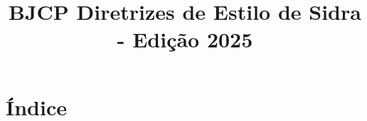 \documentclass[a4paper, 9t]{article}
\title{BJCP Diretrizes de Estilo de Sidra - Edição 2025}
\renewcommand*\contentsname{}
\begin{document}
\raggedcolumns


\section*{Índice}
\renewcommand\contentsname{}
\tableofcontents







\end{document}
